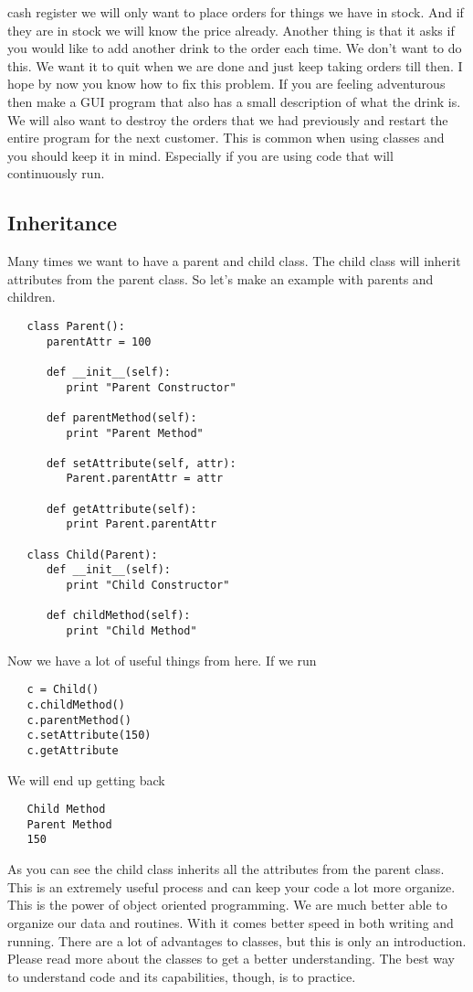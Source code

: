 \documentclass[11pt]{article}   %
\begin{document}
cash register we will only want to place orders for things we have in stock.  And if they are in stock we will know the price already.  Another thing
is that it asks if you would like to add another drink to the order each time.  We don't want to do this.  We want it to quit when we are done and just
keep taking orders till then.  I hope by now you know how to fix this problem.  If you are feeling adventurous then make a GUI program that also has a 
small description of what the drink is.  We will also want to destroy the orders that we had previously and restart the entire program for the next
customer.  This is common when using classes and you should keep it in mind.  Especially if you are using code that will continuously run.

\subsection*{Inheritance}
Many times we want to have a parent and child class. The child class will inherit attributes from the parent class.  So let's make an example with parents
and children.
\begin{tcolorbox}
   \begin{lstlisting}
   class Parent():
      parentAttr = 100

      def __init__(self):
         print "Parent Constructor"

      def parentMethod(self):
         print "Parent Method"

      def setAttribute(self, attr):
         Parent.parentAttr = attr

      def getAttribute(self):
         print Parent.parentAttr

   class Child(Parent):
      def __init__(self):
         print "Child Constructor"

      def childMethod(self):
         print "Child Method"
   \end{lstlisting}
\end{tcolorbox}
Now we have a lot of useful things from here.  If we run
\begin{tcolorbox}
   \begin{lstlisting}
   c = Child()
   c.childMethod()
   c.parentMethod()
   c.setAttribute(150)
   c.getAttribute
   \end{lstlisting}
\end{tcolorbox}
We will end up getting back
\begin{tcolorbox}
   \begin{lstlisting}
   Child Method
   Parent Method
   150
   \end{lstlisting}
\end{tcolorbox}
As you can see the child class inherits all the attributes from the parent class.  This is an extremely useful process and can keep your code a lot more 
organize.  This is the power of object oriented programming.  We are much better able to organize our data and routines.  With it comes better
speed in both writing and running.  There are a lot of advantages to classes, but this is only an introduction.  Please read more about the classes to 
get a better understanding.  The best way to understand code and its capabilities, though, is to practice.
\end{document}
